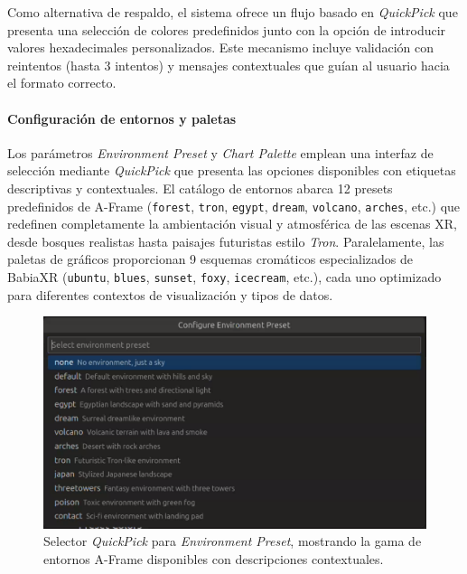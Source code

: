 \documentclass[a4paper, 12pt]{book}
\begin{document}
Como alternativa de respaldo, el sistema ofrece un flujo basado en \emph{QuickPick} que presenta una selección de colores predefinidos junto con la opción de introducir valores hexadecimales personalizados. Este mecanismo incluye validación con reintentos (hasta 3 intentos) y mensajes contextuales que guían al usuario hacia el formato correcto.

\paragraph{Configuración de entornos y paletas}
Los parámetros \emph{Environment Preset} y \emph{Chart Palette} emplean una interfaz de selección mediante \emph{QuickPick} que presenta las opciones disponibles con etiquetas descriptivas y contextuales. El catálogo de entornos abarca 12 presets predefinidos de A-Frame (\texttt{forest}, \texttt{tron}, \texttt{egypt}, \texttt{dream}, \texttt{volcano}, \texttt{arches}, etc.) que redefinen completamente la ambientación visual y atmosférica de las escenas XR, desde bosques realistas hasta paisajes futuristas estilo \emph{Tron}. Paralelamente, las paletas de gráficos proporcionan 9 esquemas cromáticos especializados de BabiaXR (\texttt{ubuntu}, \texttt{blues}, \texttt{sunset}, \texttt{foxy}, \texttt{icecream}, etc.), cada uno optimizado para diferentes contextos de visualización y tipos de datos.

\begin{figure}[H]
\centering
\includegraphics[width=0.70\linewidth]{img/ui-environment-preset-quickpick.png}
\caption{Selector \emph{QuickPick} para \emph{Environment Preset}, mostrando la gama de entornos A-Frame disponibles con descripciones contextuales.}
\label{fig:ui-environment-preset-quickpick}
\end{figure}
\end{document}
